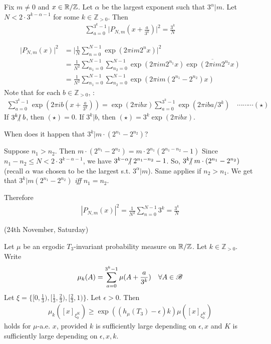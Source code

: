 \documentclass[12pt,a4paper]{report}
\newenvironment{proof}
{\begin{changemargin}{1cm}{0.5cm} 
	}%
	{\end{changemargin}
}
\newenvironment{subproof}
{\begin{changemargin}{0.5cm}{0.5cm}
	}%
	{\end{changemargin}
}
\begin{document}
\lem Fix $m\neq 0$ and $x\in \mathbb{R}/\mathbb{Z}$. Let $\alpha$ be the largest exponent such that $3^{\alpha} | m$. Let $N < 2\cdot 3^{k-\alpha -1}$ for some $k\in \mathbb{Z}_{>0}$. Then
\begin{align*}
\sum_{a=0}^{3^{k}-1} \big| P_{N,m}(x + \frac{a}{3^k}) \big|^2 = \frac{3^k}{N}
\end{align*}
\begin{proof}
\pf \begin{align*}
\big| P_{N,m}(x) \big|^2 &= \big| \frac{1}{N} \sum_{n=0}^{N-1} \exp(2\pi i m 2^n x) \big|^2 \\
&= \frac{1}{N^2} \sum_{n_1=0}^{N-1} \sum_{n_2=0}^{N-1} \exp(2\pi im2^{n_1} x) \overline{\exp(2\pi im2^{n_2} x)} \\
&= \frac{1}{N^2} \sum_{n_1=0}^{N-1} \sum_{n_2=0}^{N-1} \exp(2\pi i m(2^{n_1} - 2^{n_2}) x)
\end{align*}
Note that for each $b\in \mathbb{Z}_{>0}$, :
\begin{align*}
\sum_{a=0}^{3^k-1} \exp(2\pi ib(x+ \frac{a}{3^k})) = \exp(2\pi i bx) \sum_{a=0}^{3^k -1} \exp(2\pi iba/3^k) \quad \cdots \cdots\cdots (\star)
\end{align*}
If $3^k \hspace{-5pt}\not|\hspace{3pt} b$, then $(\star)=0$. If $3^k | b$, then $(\star) = 3^k \exp(2\pi ibx)$.
\s

When does it happen that $3^k | m \cdot (2^{n_1} - 2^{n_2})$?
\begin{subproof}
Suppose $n_1>n_2$. Then $m\cdot (2^{n_1} - 2^{n_2}) = m\cdot 2^{n_1}(2^{n_1 - n_2} -1)$ Since $n_1-n_2 \leq N < 2\cdot 3^{k - \alpha -1}$, we have $3^{k-\alpha} \hspace{-5pt}\not|\hspace{3pt} 2^{n_1-n_2} - 1$. So, $3^k \hspace{-5pt}\not|\hspace{3pt} m\cdot (2^{n_1} - 2^{n_2})$ (recall $\alpha$ was chosen to be the largest s.t. $3^{\alpha} | m$). Same applies if $n_2 >n_1$. We get that $3^k | m(2^{n_1}-2^{n_2})$ \emph{iff} $n_1 =n_2$.
\end{subproof}
Therefore
\begin{align*}
|P_{N,m}(x)|^2 = \frac{1}{N^2} \sum_{n=0}^{N-1} 3^k = \frac{3^k}{N} 
\end{align*}

\eop
\end{proof}
\s

\newday

(24th November, Saturday)
\s

\prop Let $\mu$ be an ergodic $T_{3}$-invariant probability measure on $\mathbb{R}/\mathbb{Z}$. Let $k\in \mathbb{Z}_{>0}$. Write
\begin{align*}
\mu_k(A) = \sum_{a=0}^{3^k-1} \mu(A + \frac{a}{3^k}) \quad \forall A \in \mathscr{B}
\end{align*}
Let $\xi = \{[0,\frac{1}{3}), [\frac{1}{3},\frac{2}{3}), [\frac{2}{3},1) \}$. Let $\epsilon>0$. Then
\begin{align*}
\mu_{k}([x]_{\xi_0^K}) \geq \exp( (h_{\mu}(T_3)-\epsilon)k) \mu([x]_{\xi_0^K})
\end{align*}
holds for $\mu$-a.e. $x$, provided $k$ is sufficiently large depending on $\epsilon, x$ and $K$ is sufficiently large depending on $\epsilon, x,k$.
\end{document}
